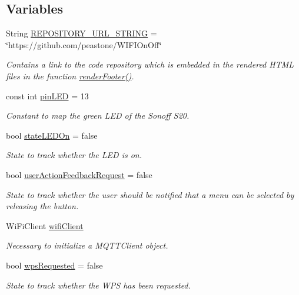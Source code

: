 \subsection*{Variables}
\begin{DoxyCompactItemize}
\item 
String \hyperlink{WIFIOnOff_8ino_ac4144c663334d0f32b58e62981300160}{R\-E\-P\-O\-S\-I\-T\-O\-R\-Y\-\_\-\-U\-R\-L\-\_\-\-S\-T\-R\-I\-N\-G} = \char`\"{}https\-://github.\-com/peastone/W\-I\-F\-I\-On\-Off\char`\"{}
\begin{DoxyCompactList}\small\item\em Contains a link to the code repository which is embedded in the rendered H\-T\-M\-L files in the function \hyperlink{WIFIOnOff_8ino_a12a8bd3c3a1288633c3eade6ee8e77cf}{render\-Footer()}. \end{DoxyCompactList}\item 
const int \hyperlink{WIFIOnOff_8ino_aea49499f7c0ed08f20649e96024455ab}{pin\-L\-E\-D} = 13
\begin{DoxyCompactList}\small\item\em Constant to map the green L\-E\-D of the Sonoff S20. \end{DoxyCompactList}\item 
bool \hyperlink{WIFIOnOff_8ino_aa1ef40baec048d45fac1d51afc521d40}{state\-L\-E\-D\-On} = false
\begin{DoxyCompactList}\small\item\em State to track whether the L\-E\-D is on. \end{DoxyCompactList}\item 
bool \hyperlink{WIFIOnOff_8ino_a3e5c7c27259449622535aee1125f275a}{user\-Action\-Feedback\-Request} = false
\begin{DoxyCompactList}\small\item\em State to track whether the user should be notified that a menu can be selected by releasing the button. \end{DoxyCompactList}\item 
Wi\-Fi\-Client \hyperlink{WIFIOnOff_8ino_a64f7c60366b0a82c42d7a1dbf4e9505a}{wifi\-Client}
\begin{DoxyCompactList}\small\item\em Necessary to initialize a M\-Q\-T\-T\-Client object. \end{DoxyCompactList}\item 
bool \hyperlink{WIFIOnOff_8ino_a002d6cec57f207948ee9f62a3fbc12fe}{wps\-Requested} = false
\begin{DoxyCompactList}\small\item\em State to track whether the W\-P\-S has been requested. \end{DoxyCompactList}\item 

\end{DoxyCompactItemize}
